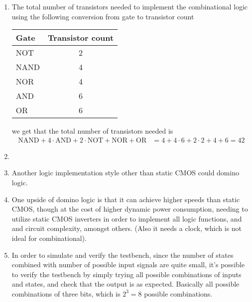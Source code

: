 \documentclass[a4paper,11pt,norsk]{article}
\begin{document}
\begin{enumerate}
    \item The total number of transistors needed to implement the combinational logic using the following conversion from gate to transistor count
        \begin{table}[H]
            \centering
            \begin{tabular}{|l|c|}
                \hline
                \textbf{Gate} & \textbf{Transistor count} \\ \hline
                NOT & 2 \\ \hline
                NAND & 4 \\ \hline
                NOR  & 4 \\ \hline
                AND & 6 \\ \hline
                OR  & 6 \\ \hline
            \end{tabular}
        \end{table}
        we get that the total number of transistors needed is
        \begin{align*}
            \text{NAND} + 4 \cdot \text{AND} + 2 \cdot \text{NOT} + \text{NOR} + \text{OR} &= 4 + 4 \cdot 6 + 2 \cdot 2 + 4 + 6 = 42
        \end{align*}
\item
    \item Another logic implementation style other than static CMOS could domino logic. 
    \item One upside of domino logic is that it can achieve higher speeds than static CMOS, though at the cost of higher dynamic power consumption, 
        needing to utilize static CMOS inverters in order to implement all logic functions, and and circuit complexity, amongst others. (Also it needs a clock,
        which is not ideal for combinational).
    \item In order to simulate and verify the testbench, since the number of states combined with number of possible input signals are quite small,
        it's possible to verify the testbench by simply trying all possible combinations of inputs and states, and check that the output is as expected. 
        Basically all possible combinations of three bits, which is $2^3 = 8$ possible combinations.
\end{enumerate}
\end{document}
